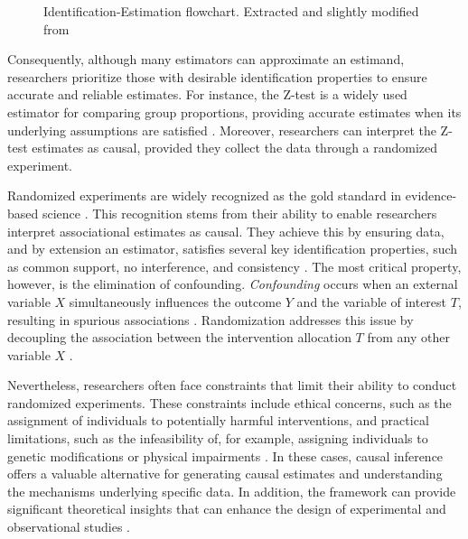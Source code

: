 \documentclass[
  authoryear,
  review,
  1p]{elsarticle}
\begin{document}
\begin{figure}


\caption{\label{fig-IEflow}Identification-Estimation flowchart.
Extracted and slightly modified from \citet[pp.~32]{Neal_2020}}

\end{figure}%

Consequently, although many estimators can approximate an estimand,
researchers prioritize those with desirable identification properties to
ensure accurate and reliable estimates. For instance, the Z-test is a
widely used estimator for comparing group proportions, providing
accurate estimates when its underlying assumptions are satisfied
\citep{Kanji_2006}. Moreover, researchers can interpret the Z-test
estimates as causal, provided they collect the data through a randomized
experiment.

Randomized experiments are widely recognized as the gold standard in
evidence-based science \citep{Hariton_et_al_2018, Hansson_2014}. This
recognition stems from their ability to enable researchers interpret
associational estimates as causal. They achieve this by ensuring data,
and by extension an estimator, satisfies several key identification
properties, such as common support, no interference, and consistency
\citep{Morgan_et_al_2014, Neal_2020}. The most critical property,
however, is the elimination of confounding. \emph{Confounding} occurs
when an external variable \(X\) simultaneously influences the outcome
\(Y\) and the variable of interest \(T\), resulting in spurious
associations \citep{Everitt_et_al_2010}. Randomization addresses this
issue by decoupling the association between the intervention allocation
\(T\) from any other variable \(X\)
\citep{Morgan_et_al_2014, Neal_2020}.

Nevertheless, researchers often face constraints that limit their
ability to conduct randomized experiments. These constraints include
ethical concerns, such as the assignment of individuals to potentially
harmful interventions, and practical limitations, such as the
infeasibility of, for example, assigning individuals to genetic
modifications or physical impairments \citep{Neal_2020}. In these cases,
causal inference offers a valuable alternative for generating causal
estimates and understanding the mechanisms underlying specific data. In
addition, the framework can provide significant theoretical insights
that can enhance the design of experimental and observational studies
\citep{McElreath_2020}.
\end{document}

